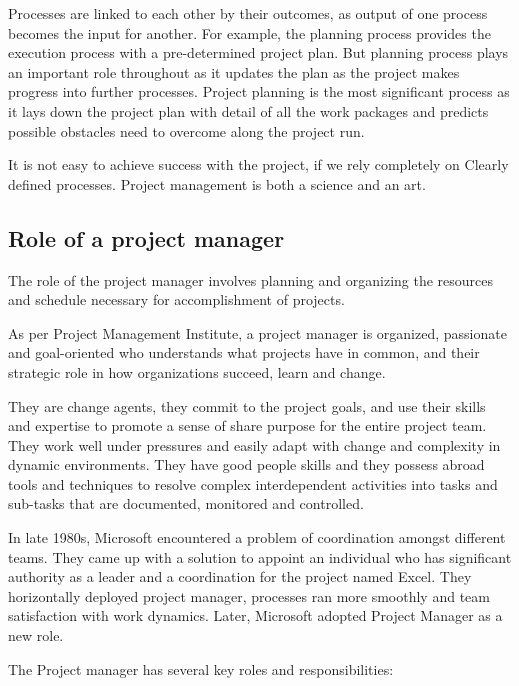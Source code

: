  Processes are linked to each other by their outcomes, as output of one process becomes the input for another. For example, the planning process provides the execution process with a pre-determined project plan. But planning process plays an important role throughout as it updates the plan as the project makes progress into further processes. Project planning is the most significant process as it lays down the project plan with detail of all the work packages and predicts possible obstacles need to overcome along the project run.

It is not easy to achieve success with the project, if we rely completely on 
Clearly defined processes. Project management is both a science and an art.

\subsection{Role of a project manager}
\label{subsec:subsec02}

The role of the project manager involves planning and organizing the resources and schedule necessary for accomplishment of projects.

As per Project Management Institute, a project manager is organized, passionate and goal-oriented who understands what projects have in common, and their strategic role in how organizations succeed, learn and change.

They are change agents, they commit to the project goals, and use their skills and expertise to promote a sense of share purpose for the entire project team.
They work well under pressures and easily adapt with change and complexity in dynamic environments. They have good people skills and they possess abroad tools and techniques to resolve complex interdependent activities into tasks and sub-tasks that are documented, monitored and controlled.

In late 1980s, Microsoft encountered a problem of coordination amongst different teams. They came up with a solution to appoint an individual who has significant authority as a leader and a coordination for the project named Excel. They horizontally deployed project manager, processes ran more smoothly and team satisfaction with work dynamics. Later, Microsoft adopted Project Manager as a new role.

The Project manager has several key roles and responsibilities:

